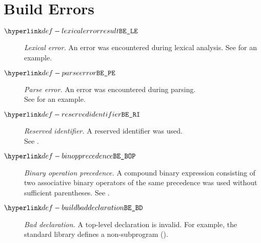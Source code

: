 \section{Build Errors\label{sec:BuildErrors}}
\begin{description}
  \item[$\LexicalError$]
    \textit{Lexical error.}
    An error was encountered during lexical analysis.
    See  for an example.

  \item[$\ParseError$]
    \textit{Parse error.}
    An error was encountered during parsing. \\
    See  for an example.

  \hypertarget{def-reservedidentifier}{}
  \item[$\ReservedIdentifier$]
    \textit{Reserved identifier.}
    A reserved identifier was used. \\
    See .

  \hypertarget{def-binopprecedence}{}
  \item[$\BinopPrecedence$]
    \textit{Binary operation precedence.}
    A compound binary expression consisting of two associative binary operators of the same precedence was used without sufficient parentheses.
    See .

  \hypertarget{def-buildbaddeclaration}{}
  \item[$\BuildBadDeclaration$]
    \textit{Bad declaration.}
    A top-level declaration is invalid.
    For example, the standard library defines a non-subprogram ().
\end{description}

